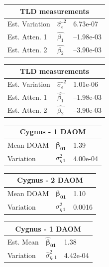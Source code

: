 \documentclass[landscape,a0paper,fontscale=0.285]{baposter} %
\newcommand{\vect}[1]{\boldsymbol{#1}}
\begin{document}
\begin{poster}
{\begin{multicols}{3}
\begin{center}
{\renewcommand{\arraystretch}{1.2}
\begin{tabular}{|l|l|l|}
\hline
\multicolumn{3}{|c|}{TLD measurements}\\
\hline
    Est. Variation     & $\widehat{\sigma_\epsilon}^2$ & 6.73e-07  \\ \hline
    Est. Atten. 1 & $\widehat{\beta_1}$           &--1.98e-03 \\ \hline
    Est. Atten. 2 & $\widehat{\beta_2}$           &--3.90e-03 \\ \hline
\end{tabular}

\begin{tabular}{|l|l|l|}
\hline
\multicolumn{3}{|c|}{TLD measurements}\\
\hline
    Est. Variation     & $\widehat{\sigma_\epsilon}^2$ & 1.01e-06  \\ \hline
    Est. Atten. 1 & $\widehat{\beta_1}$           &--1.98e-03 \\ \hline
    Est. Atten. 2 & $\widehat{\beta_2}$           &--3.90e-03 \\ \hline
\end{tabular}
}

\end{center}
\end{multicols}

\begin{multicols}{3}
\begin{center}
{\small 
\renewcommand{\arraystretch}{1.2}
\begin{tabular}{|l|l|l|}
\hline
\multicolumn{3}{|c|}{Cygnus - 1 DAOM}\\
    \hline
    Mean DOAM       & $\vect{\beta_{01}}$  &1.39     \\\hline
    Variation       & $\sigma_{\eta\,1}^2$ &4.00e-04 \\\hline
\end{tabular}

\vspace{1em}
\begin{tabular}{|l|l|l|}
\hline
\multicolumn{3}{|c|}{Cygnus - 2 DAOM}\\
    \hline
    Mean DOAM & $\vect{\beta_{01}}$  &1.10     \\\hline
    Variation       & $\sigma_{\eta\,1}^2$ &0.0016   \\\hline
\end{tabular}
}

{\small
\renewcommand{\arraystretch}{1.2}
\begin{tabular}{|l|l|l|}
\hline
\multicolumn{3}{|c|}{Cygnus - 1 DAOM}\\
    \hline
   Est. Mean & $\vect{\widehat\beta_{01}}$   & 1.38\\\hline
    Variation       & $\widehat{\sigma}_{\eta,1}^2$ & 4.42e-04\\\hline
\end{tabular}

}
\end{center}
\end{multicols}}
\end{poster}
\end{document}
